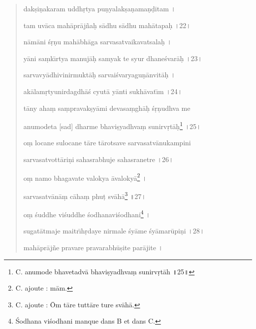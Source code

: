\documentclass[a4paper, 11pt, oneside, french, landscape, twocolumn]{article}
\begin{document}
\begin{quotation}
\bigskip

dak\d{s}i\d{n}akaram uddh\d{r}tya pu\d{n}yalak\d{s}a\d{n}ama\d{n}\d{d}itam \texthindi{।}

tam uv\={a}ca mah\={a}pr\={a}j\~{n}a\d{h} s\={a}dhu s\={a}dhu mah\={a}tapa\d{h} \texthindi{।}22\texthindi{।}

\bigskip

n\={a}m\={a}ni \'{s}\d{r}\d{n}u mah\={a}bh\={a}ga sarvasatvaikavatsala\d{h} \texthindi{।}

y\={a}ni sa\d{m}k\={\i}rtya manuj\={a}\d{h} samyak te syur dhane\'{s}var\={a}\d{h} \texthindi{।}23\texthindi{।}

\bigskip

sarvavy\={a}dhivinirmukt\={a}\d{h} sarvai\'{s}varyagu\d{n}\={a}nvit\={a}\d{h} \texthindi{।}

ak\={a}lam\d{r}tyunirdagdh\={a}\'{s} cyut\={a} y\={a}nti sukh\={a}vat\={\i}m \texthindi{।}24\texthindi{।}

\bigskip

t\={a}ny aha\d{m} sa\d{m}pravak\d{s}y\={a}mi devasa\d{m}gh\={a}\d{h} \'{s}\d{r}\d{n}udhva me

anumodeta [sad] dharme bhavi\d{s}yadhva\d{m} sunirv\d{r}t\={a}\d{h}\footnote{C. anumode bhavetadv\={a} bhavi\d{s}yadhva\d{m} sunirv\d{r}t\={a}h \texthindi{॥}25\texthindi{॥}} \texthindi{।}25\texthindi{।}

\bigskip

o\d{m} locane sulocane t\={a}re t\={a}rotsave sarvasatv\={a}nukampini

sarvasatvott\={a}ri\d{n}i sahasrabhuje sahasranetre \texthindi{।}26\texthindi{।}

\bigskip

o\d{m} namo bhagavate valokya \={a}valoky\={a}\footnote{C. ajoute : m\={a}m.} \texthindi{।}

sarvasatv\={a}n\={a}\d{m} c\={a}ha\d{m} phu\d{t} sv\={a}h\={a}\footnote{C. ajoute : \={O}m t\={a}re tutt\={a}re ture sv\={a}h\={a}.} \texthindi{॥}27\texthindi{।}

\bigskip

o\d{m} \'{s}uddhe vi\'{s}uddhe \'{s}odhanavi\'{s}odhani\footnote{\'{S}odhana vi\'{s}odhani manque dans B et dans C.} \texthindi{।}

sugat\={a}tmaje maitr\={\i}h\d{r}daye nirmale \'{s}y\={a}me \'{s}y\={a}mar\={u}pi\d{n}i \texthindi{।}28\texthindi{।}

\bigskip

mah\={a}pr\={a}j\~{n}e pravare pravarabh\={u}\d{s}ite par\={a}jite \texthindi{।}


\end{quotation}
\end{document}
